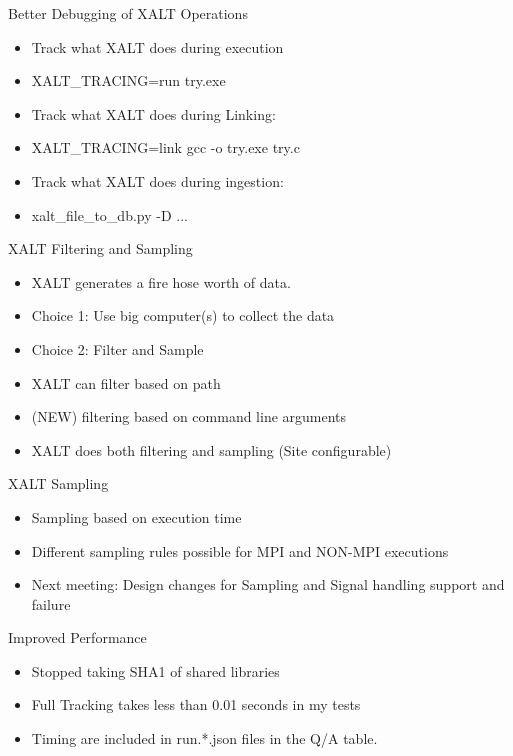 \documentclass{beamer}
\begin{document}
\begin{frame}{Better Debugging of XALT Operations}
  \begin{itemize}
    \item Track what XALT does during execution
    \item XALT\_TRACING=run try.exe
    \item Track what XALT does during Linking:
    \item XALT\_TRACING=link gcc -o try.exe try.c
    \item Track what XALT does during ingestion:
    \item xalt\_file\_to\_db.py -D ...
  \end{itemize}
\end{frame}

\begin{frame}{XALT Filtering and Sampling}
  \begin{itemize}
    \item XALT generates a fire hose worth of data.
    \item Choice 1: Use big computer(s)  to collect the data
    \item Choice 2: Filter and Sample
    \item XALT can filter based on path
    \item (NEW) filtering based on command line arguments
    \item XALT does both filtering and sampling (Site configurable)
   \end{itemize}
\end{frame}

\begin{frame}{XALT Sampling}
  \begin{itemize}
    \item Sampling based on execution time
    \item Different sampling rules possible for MPI and NON-MPI
      executions
    \item Next meeting: Design changes for Sampling and Signal
      handling support and failure
  \end{itemize}
\end{frame}

\begin{frame}{Improved Performance}
  \begin{itemize}
    \item Stopped taking SHA1 of shared libraries
    \item Full Tracking takes less than 0.01 seconds in my tests
    \item Timing are included in run.*.json files in the Q/A table.
  \end{itemize}
\end{frame}
\end{document}
